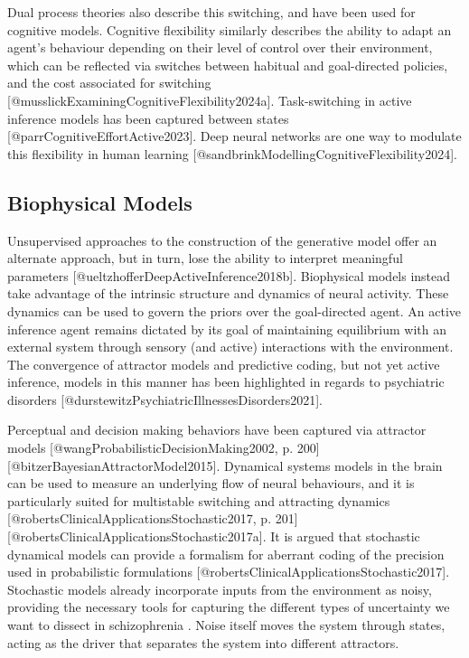 \documentclass{article}
\begin{document}
Dual process theories also describe this switching, and have been used for cognitive models. Cognitive flexibility similarly describes the ability to adapt an agent's behaviour depending on their level of control over their environment, which can be reflected via switches between habitual and goal-directed policies, and the cost associated for switching [@musslickExaminingCognitiveFlexibility2024a]. Task-switching in active inference models has been captured between states [@parrCognitiveEffortActive2023]. Deep neural networks are one way to modulate this flexibility in human learning [@sandbrinkModellingCognitiveFlexibility2024].

\subsection{Biophysical Models}
Unsupervised approaches to the construction of the generative model offer an alternate approach, but in turn, lose the ability to interpret meaningful parameters [@ueltzhofferDeepActiveInference2018b]. Biophysical models instead take advantage of the intrinsic structure and dynamics of neural activity. These dynamics can be used to govern the priors over the goal-directed agent. An active inference agent remains dictated by its goal of maintaining equilibrium with an external system through sensory (and active) interactions with the environment. The convergence of attractor models and predictive coding, but not yet active inference, models in this manner has been highlighted in regards to psychiatric disorders [@durstewitzPsychiatricIllnessesDisorders2021].

Perceptual and decision making behaviors have been captured via attractor models [@wangProbabilisticDecisionMaking2002, p. 200] [@bitzerBayesianAttractorModel2015]. Dynamical systems models in the brain can be used to measure an underlying flow of neural behaviours, and it is particularly suited for multistable switching and attracting dynamics [@robertsClinicalApplicationsStochastic2017, p. 201] [@robertsClinicalApplicationsStochastic2017a]. It is argued that stochastic dynamical models can provide a formalism for aberrant coding of the precision used in probabilistic formulations [@robertsClinicalApplicationsStochastic2017]. Stochastic models already incorporate inputs from the environment as noisy, providing the necessary tools for capturing the different types of uncertainty we want to dissect in schizophrenia . Noise itself moves the system through states, acting as the driver that separates the system into different attractors.
\end{document}
